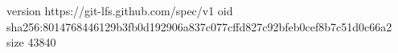 version https://git-lfs.github.com/spec/v1
oid sha256:8014768446129b3fb0d192906a837c077cffd827c92bfeb0cef8b7c51d0c66a2
size 43840
